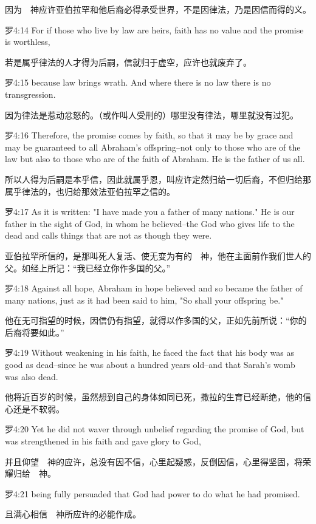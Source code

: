 \documentclass[a4paper,11pt,onecolumn,twoside]{ctexart}
\begin{document}
\begin{multicols}{2}
 因为　神应许亚伯拉罕和他后裔必得承受世界，不是因律法，乃是因信而得的义。


 罗4:14
 For if those who live by law are heirs, faith has no value and the promise is worthless,

 若是属乎律法的人才得为后嗣，信就归于虚空，应许也就废弃了。


 罗4:15
 because law brings wrath. And where there is no law there is no transgression.

 因为律法是惹动忿怒的。（或作叫人受刑的）哪里没有律法，哪里就没有过犯。


 罗4:16
 Therefore, the promise comes by faith, so that it may be by grace and may be guaranteed to all Abraham's offspring--not only to those who are of the law but also to those who are of the faith of Abraham. He is the father of us all.

 所以人得为后嗣是本乎信，因此就属乎恩，叫应许定然归给一切后裔，不但归给那属乎律法的，也归给那效法亚伯拉罕之信的。


 罗4:17
 As it is written: "I have made you a father of many nations." He is our father in the sight of God, in whom he believed--the God who gives life to the dead and calls things that are not as though they were.

 亚伯拉罕所信的，是那叫死人复活、使无变为有的　神，他在主面前作我们世人的父。如经上所记：“我已经立你作多国的父。”


 罗4:18
 Against all hope, Abraham in hope believed and so became the father of many nations, just as it had been said to him, "So shall your offspring be."

 他在无可指望的时候，因信仍有指望，就得以作多国的父，正如先前所说：“你的后裔将要如此。”


 罗4:19
 Without weakening in his faith, he faced the fact that his body was as good as dead--since he was about a hundred years old--and that Sarah's womb was also dead.

 他将近百岁的时候，虽然想到自己的身体如同已死，撒拉的生育已经断绝，他的信心还是不软弱。


 罗4:20
 Yet he did not waver through unbelief regarding the promise of God, but was strengthened in his faith and gave glory to God,

 并且仰望　神的应许，总没有因不信，心里起疑惑，反倒因信，心里得坚固，将荣耀归给　神。


 罗4:21
 being fully persuaded that God had power to do what he had promised.

 且满心相信　神所应许的必能作成。



\end{multicols}
\end{document}
